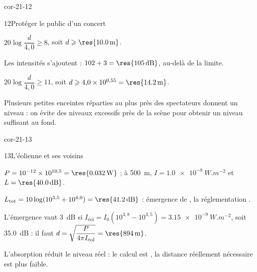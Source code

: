 \begin{blocLivre}{cor-21-12}
\begin{corrige}{12}{Protéger le public d'un concert}
\begin{questions}
\item $20\log\dfrac{d}{4{,}0}\geqslant8$, soit $d\geqslant\res{\qty{10,0}{m}}$.
\item Les intensités s'ajoutent : $102+3=\res{\qty{105}{dB}}$, au-delà de la limite.
\item $20\log\dfrac{d}{4{,}0}\geqslant11$, soit $d\geqslant4{,}0\times10^{0{,}55}=\res{\qty{14,2}{m}}$.
\item Plusieurs petites enceintes réparties au plus près des spectateurs donnent un niveau  : on évite
des niveaux excessifs près de la scène pour obtenir un niveau suffisant au fond.
\end{questions}
\end{corrige}
\end{blocLivre}
\begin{blocLivre}{cor-21-13}
\begin{corrige}{13}{L'éolienne et ses voisins}
\begin{questions}
\item $P=10^{-12}\times10^{10{,}5}=\res{\qty{0,032}{W}}$ ; à \qty{500}{m}, $I=\qty{1,0e-8}{W.m^{-2}}$ et $L=\res{\qty{40,0}{dB}}$.
\item $L_\mathrm{tot}=10\log(10^{3{,}5}+10^{4{,}0})=\res{\qty{41,2}{dB}}$ : émergence de , la réglementation
.
\item L'émergence vaut \qty{3}{dB} si $I_\text{éol}=I_0(10^{3{,}8}-10^{3{,}5})=\qty{3,15e-9}{W.m^{-2}}$, soit \qty{35,0}{dB} : il faut
$d=\sqrt{\dfrac{P}{4\pi I_\text{éol}}}=\res{\qty{894}{m}}$.
\item L'absorption réduit le niveau réel : le calcul est , la distance réellement nécessaire est plus
faible.
\end{questions}
\end{corrige}
\end{blocLivre}
